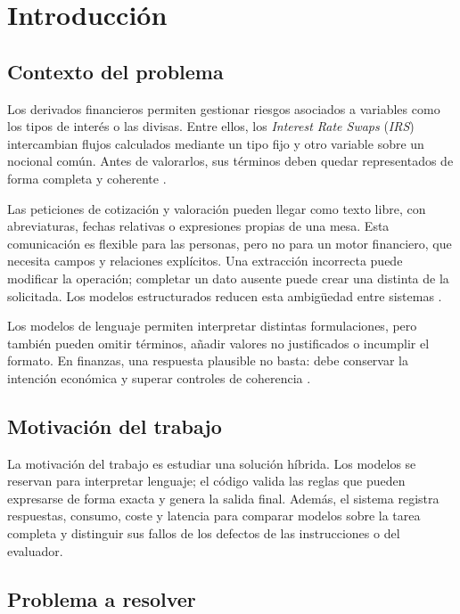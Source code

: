 \chapter{Introducción}
\label{cap:introduccion}

\section{Contexto del problema}
\label{sec:contexto_problema}

Los derivados financieros permiten gestionar riesgos asociados a variables como los tipos de interés o las divisas. Entre ellos, los \textit{Interest Rate Swaps} (\textit{IRS}) intercambian flujos calculados mediante un tipo fijo y otro variable sobre un nocional común. Antes de valorarlos, sus términos deben quedar representados de forma completa y coherente \citep{hull2021derivatives,ausin2025quantitative}.

Las peticiones de cotización y valoración pueden llegar como texto libre, con abreviaturas, fechas relativas o expresiones propias de una mesa. Esta comunicación es flexible para las personas, pero no para un motor financiero, que necesita campos y relaciones explícitos. Una extracción incorrecta puede modificar la operación; completar un dato ausente puede crear una distinta de la solicitada. Los modelos estructurados reducen esta ambigüedad entre sistemas \citep{isda2023cdm}.

Los modelos de lenguaje permiten interpretar distintas formulaciones, pero también pueden omitir términos, añadir valores no justificados o incumplir el formato. En finanzas, una respuesta plausible no basta: debe conservar la intención económica y superar controles de coherencia \citep{shah2023finllms,tam2024formatrestrictions}.

\section{Motivación del trabajo}
\label{sec:motivacion}

La motivación del trabajo es estudiar una solución híbrida. Los modelos se reservan para interpretar lenguaje; el código valida las reglas que pueden expresarse de forma exacta y genera la salida final. Además, el sistema registra respuestas, consumo, coste y latencia para comparar modelos sobre la tarea completa y distinguir sus fallos de los defectos de las instrucciones o del evaluador.

\section{Problema a resolver}
\label{sec:problema_resolver}

